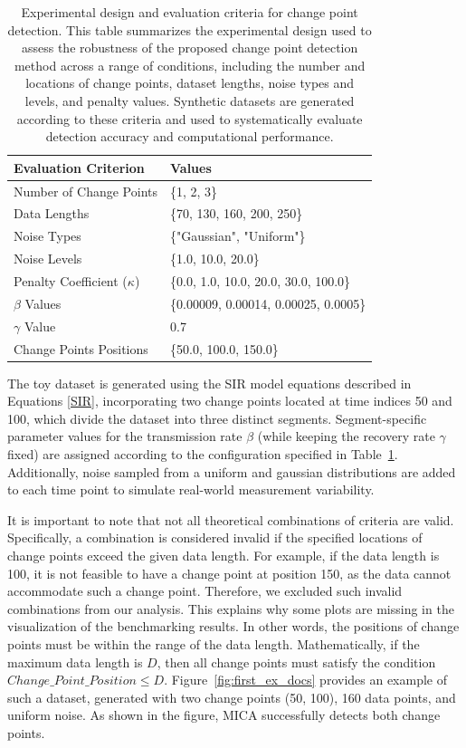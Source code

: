 \documentclass[10pt,letterpaper]{article}
\begin{document}
\begin{table}[h]
\centering
\begin{tabular}{|l|l|}
\hline
\textbf{Evaluation Criterion} & \textbf{Values} \\ \hline
Number of Change Points & \{1, 2, 3\} \\ \hline
Data Lengths & \{70, 130, 160, 200, 250\} \\ \hline
Noise Types & \{"Gaussian", "Uniform"\} \\ \hline
Noise Levels & \{1.0, 10.0, 20.0\} \\ \hline
Penalty Coefficient ($\kappa$) & \{0.0, 1.0, 10.0, 20.0, 30.0, 100.0\} \\ \hline
$\beta$ Values & \{0.00009, 0.00014, 0.00025, 0.0005\} \\ \hline
$\gamma$ Value & 0.7 \\ \hline
Change Points Positions & \{50.0, 100.0, 150.0\} \\ \hline
\end{tabular}
\caption{Experimental design and evaluation criteria for change point detection.
This table summarizes the experimental design used to assess the robustness of the proposed change point detection method across a range of conditions, including the number and locations of change points, dataset lengths, noise types and levels, and penalty values. Synthetic datasets are generated according to these criteria and used to systematically evaluate detection accuracy and computational performance.}
\label{tab:criteria_evaluation}
\end{table}

The toy dataset is generated using the SIR model equations described in Equations \ref{SIR}, incorporating two change points located at time indices 50 and 100, which divide the dataset into three distinct segments. Segment-specific parameter values for the transmission rate \(\beta\) (while keeping the recovery rate \(\gamma\) fixed) are assigned according to the configuration specified in Table~\ref{tab:criteria_evaluation}. Additionally, noise sampled from a uniform and gaussian distributions are added to each time point to simulate real-world measurement variability.

It is important to note that not all theoretical combinations of criteria are valid. Specifically, a combination is considered invalid if the specified locations of change points exceed the given data length. For example, if the data length is 100, it is not feasible to have a change point at position 150, as the data cannot accommodate such a change point. Therefore, we excluded such invalid combinations from our analysis. This explains why some plots are missing in the visualization of the benchmarking results. In other words, the positions of change points must be within the range of the data length. Mathematically, if the maximum data length is \( D \), then all change points must satisfy the condition \( Change\_Point\_Position \leq D \). Figure~\ref{fig:first_ex_docs} provides an example of such a dataset, generated with two change points (50, 100), 160 data points, and uniform noise. As shown in the figure, MICA successfully detects both change points.
\end{document}
